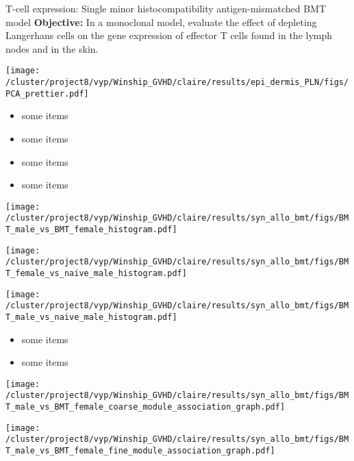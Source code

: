 \documentclass[final,hyperref={pdfpagelabels=false}]{beamer}
\begin{document}
\begin{frame}{}
\begin{columns}[t]
      \begin{column}{.25\linewidth}
        \begin{block}{T-cell expression: Single minor histocompatibility antigen-mismatched BMT model}
	  {\bf Objective:} In a monoclonal model, evaluate the effect of depleting Langerhans cells on the gene expression of effector T cells found in the lymph nodes and in the skin.
	  \begin{center}
	   \texttt{[image: /cluster/project8/vyp/Winship\_GVHD/claire/results/epi\_dermis\_PLN/figs/PCA\_prettier.pdf]}
            \end{center}
          \begin{itemize}
          \item some items
          \item some items
          \item some items
          \item some items
          \end{itemize}
	  \begin{minipage}{0.45\textwidth}
            \texttt{[image: /cluster/project8/vyp/Winship\_GVHD/claire/results/syn\_allo\_bmt/figs/BMT\_male\_vs\_BMT\_female\_histogram.pdf]}
          \end{minipage}
          \begin{minipage}{0.45\textwidth}
            \texttt{[image: /cluster/project8/vyp/Winship\_GVHD/claire/results/syn\_allo\_bmt/figs/BMT\_female\_vs\_naive\_male\_histogram.pdf]}
          \end{minipage}
	  \begin{minipage}{0.45\textwidth}
            \texttt{[image: /cluster/project8/vyp/Winship\_GVHD/claire/results/syn\_allo\_bmt/figs/BMT\_male\_vs\_naive\_male\_histogram.pdf]}
          \end{minipage}
	  \begin{itemize}
	    \item some items
	    \item some items
	   \end{itemize}
	  \begin{minipage}{0.45\textwidth}
            \texttt{[image: /cluster/project8/vyp/Winship\_GVHD/claire/results/syn\_allo\_bmt/figs/BMT\_male\_vs\_BMT\_female\_coarse\_module\_association\_graph.pdf]}
          \end{minipage}
	   \begin{minipage}{0.45\textwidth}
            \texttt{[image: /cluster/project8/vyp/Winship\_GVHD/claire/results/syn\_allo\_bmt/figs/BMT\_male\_vs\_BMT\_female\_fine\_module\_association\_graph.pdf]}

\end{minipage}
\end{block}
\end{column}
\end{columns}
\end{frame}
\end{document}
